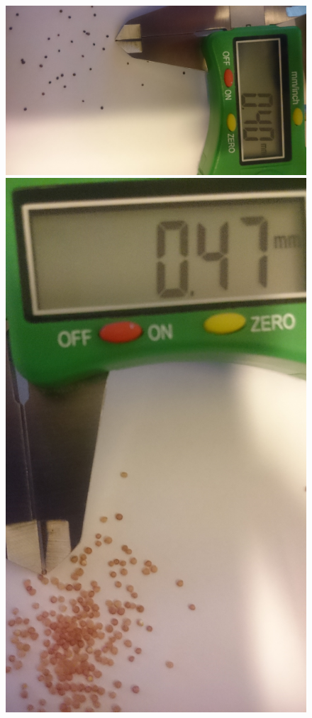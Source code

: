  \begin{figure}[htbp] \centering
\begin{minipage}[b]{0.48\textwidth} \centering
\includegraphics[width=1.00\textwidth]{billeder/Hovedrapport/timian.jpg} %
\end{minipage} \hfill
\begin{minipage}[b]{0.48\textwidth} \centering
\includegraphics[width=1.00\textwidth]{billeder/Hovedrapport/foxtail.jpg} %

\end{minipage}
\end{figure}

